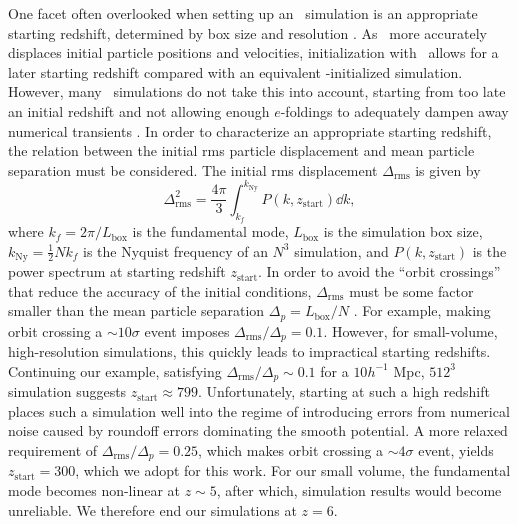 One facet often overlooked when setting up an \nbody\ simulation is an appropriate starting redshift, determined by box size and resolution \citep{2007ApJ...671.1160L}.  As \lpt\ more accurately displaces initial particle positions and velocities, initialization with \lpt\ allows for a later starting redshift compared with an equivalent \za-initialized simulation.  However, many \za\ simulations do not take this into account, starting from too late an initial redshift and not allowing enough $e$-foldings to adequately dampen away numerical transients \citep{2006MNRAS.373..369C, 2010MNRAS.403.1859J}.  In order to characterize an appropriate starting redshift, the relation between the initial rms particle displacement and mean particle separation must be considered.  The initial rms displacement $\Delta_{\mathrm{rms}}$ is given by
\begin{equation}
	\Delta_{\mathrm{rms}}^{2} = \frac{4 \pi}{3} \int_{k_{f}}^{k_{\mathrm{Ny}}} P(k, z_{\mathrm{start}}) \dd k,
\end{equation}
where $k_{f} = 2 \pi / L_{\mathrm{box}}$ is the fundamental mode, $L_{\mathrm{box}}$ is the simulation box size, $k_{\mathrm{Ny}} = \frac{1}{2} N k_{f}$ is the Nyquist frequency of an $N^{3}$ simulation, and $P(k, z_{\mathrm{start}})$ is the power spectrum at starting redshift $z_{\mathrm{start}}$.  In order to avoid the ``orbit crossings'' that reduce the accuracy of the initial conditions, $\Delta_{\mathrm{rms}}$ must be some factor smaller than the mean particle separation $\Delta_{p} = L_{\mathrm{box}} / N$ \citep{2012ApJ...761L...8H}.  For example, making orbit crossing a $\sim 10 \sigma$ event imposes $\Delta_{\mathrm{rms}} / \Delta_{p} = 0.1$.  However, for small-volume, high-resolution simulations, this quickly leads to impractical starting redshifts.  Continuing our example, satisfying $\Delta_{\mathrm{rms}} / \Delta_{p} \sim 0.1$ for a $10 h^{-1}$ Mpc, $512^{3}$ simulation suggests $z_{\mathrm{start}} \approx 799$.  Unfortunately, starting at such a high redshift places such a simulation well into the regime of introducing errors from numerical noise caused by roundoff errors dominating the smooth potential.  A more relaxed requirement of $\Delta_{\mathrm{rms}} / \Delta_{p} = 0.25$, which makes orbit crossing a $\sim 4\sigma$ event, yields $z_{\mathrm{start}} = 300$, which we adopt for this work.  For our small volume, the fundamental mode becomes non-linear at $z \sim 5$, after which, simulation results would become unreliable.  We therefore end our simulations at $z = 6$.




